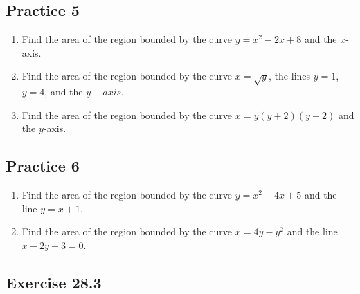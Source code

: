 \documentclass{report}
\begin{document}
\subsection{Practice 5}

\begin{enumerate}
    \item Find the area of the region bounded by the curve $y = x^2 - 2x + 8$ and the
          $x$-axis.
    \item Find the area of the region bounded by the curve $x = \sqrt{y}$, the lines $y =
              1$, $y = 4$, and the $y-axis$.
    \item Find the area of the region bounded by the curve $x = y(y+2)(y-2)$ and the
          $y$-axis.
\end{enumerate}

\subsection{Practice 6}

\begin{enumerate}
    \item Find the area of the region bounded by the curve $y = x^2 - 4x + 5$ and the
          line $y = x + 1$.
    \item Find the area of the region bounded by the curve $x = 4y - y^2$ and the line $x
              - 2y + 3 = 0$.
\end{enumerate}

\subsection{Exercise 28.3}
\end{document}
